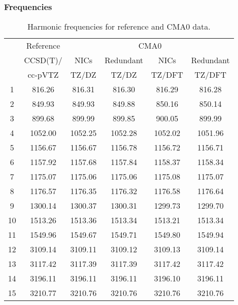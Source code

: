 \documentclass[10pt,oneside]{article}
\begin{document}
\begin{table}[h!]
\subsubsection*{Frequencies}
\centering
\caption{Harmonic frequencies for reference and CMA0 data.}
\begin{tabular}{cccccc}
\toprule
{} & Reference & \multicolumn{4}{c}{CMA0} \\
{} &  CCSD(T)/ &    NICs &  Redundant &    NICs & Redundant \\
{} &   cc-pVTZ &   TZ/DZ &      TZ/DZ &  TZ/DFT &    TZ/DFT \\
\midrule
1  &    816.26 &  816.31 &     816.30 &  816.29 &    816.28 \\
2  &    849.93 &  849.93 &     849.88 &  850.16 &    850.14 \\
3  &    899.68 &  899.99 &     899.85 &  900.05 &    899.99 \\
4  &   1052.00 & 1052.25 &    1052.28 & 1052.02 &   1051.96 \\
5  &   1156.67 & 1156.67 &    1156.78 & 1156.72 &   1156.71 \\
6  &   1157.92 & 1157.68 &    1157.84 & 1158.37 &   1158.34 \\
7  &   1175.07 & 1175.06 &    1175.06 & 1175.08 &   1175.07 \\
8  &   1176.57 & 1176.35 &    1176.32 & 1176.58 &   1176.64 \\
9  &   1300.14 & 1300.37 &    1300.31 & 1299.73 &   1299.70 \\
10 &   1513.26 & 1513.36 &    1513.34 & 1513.21 &   1513.34 \\
11 &   1549.96 & 1549.67 &    1549.71 & 1549.80 &   1549.94 \\
12 &   3109.14 & 3109.11 &    3109.12 & 3109.13 &   3109.14 \\
13 &   3117.42 & 3117.39 &    3117.39 & 3117.42 &   3117.42 \\
14 &   3196.11 & 3196.11 &    3196.11 & 3196.10 &   3196.11 \\
15 &   3210.77 & 3210.76 &    3210.76 & 3210.76 &   3210.76 \\
\bottomrule
\end{tabular}
\end{table}
\end{document}
